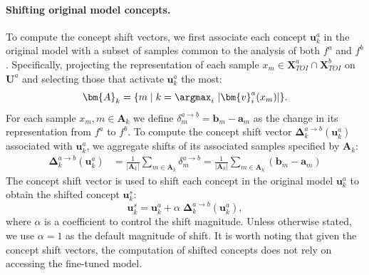 \paragraph{Shifting original model concepts.} To compute the concept shift vectors, we first associate each concept $\bm{u}^a_k$ in the original model with a subset of samples common to the analysis of both $f^a$ and $f^b$. Specifically, projecting the representation of each sample $x_m \in \bm{X}_{TOI}^{a} \cap \bm{X}_{TOI}^{b}$ on $\bm{U}^a$ and selecting those that activate $\bm{u}^a_k$ the most:
$$\bm{A}_{k} = \{ m \;|\; k = \argmax_{i} \, \left|\bm{v}^a_i(x_m) \right| \}.$$ 
For each sample $x_m, m \in \bm{A}_k$ we define $\delta^{a \to b}_m = \bm{b}_m - \bm{a}_m$ as the change in its representation from $f^a$ to $f^b$. To compute the concept shift vector $\bm{\Delta}_k^{a \to b}(\bm{u}^a_k)$ associated with $\bm{u}^a_k$, we aggregate shifts of its associated samples specified by $\bm{A}_k$:
\begin{align}
    \bm{\Delta}_k^{a \to b}(\bm{u}^a_k) &= \frac{1}{|\bm{A}_{k}|} \sum_{m \in \bm{A}_{k}} \delta^{a \to b}_m = \frac{1}{|\bm{A}_{k}|} \sum_{m \in \bm{A}_{k}} (\bm{b}_m - \bm{a}_m) \nonumber
\end{align}
The concept shift vector is used to shift each concept in the original model $\bm{u}^a_k$ to obtain the shifted concept $\bm{u}^s_k$:
\begin{equation}
    \bm{u}^s_k = \bm{u}^a_k + \alpha \; \bm{\Delta}_k^{a \to b}(\bm{u}^a_k),
\end{equation}
where $\alpha$ is a coefficient to control the shift magnitude. Unless otherwise stated, we use $\alpha=1$ as the default magnitude of shift. It is worth noting that given the concept shift vectors, the computation of shifted concepts does not rely on accessing the fine-tuned model. 

    
    


